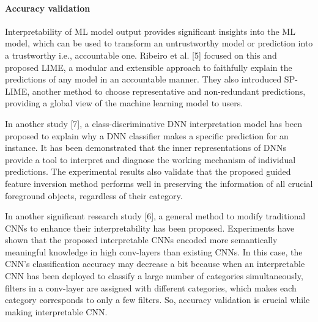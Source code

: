\paragraph{\textbf{Accuracy validation}}
Interpretability of ML model output provides significant insights into the ML model, which can be used to transform an untrustworthy model or prediction into a trustworthy i.e., accountable one. Ribeiro et al. [5] focused on this and proposed LIME, a modular and extensible approach to faithfully explain the predictions of any model in an accountable manner. They also introduced SP-LIME, another method to choose representative and non-redundant predictions, providing a global view of the machine learning model to users.

In another study [7], a class-discriminative DNN interpretation model has been proposed to explain why a DNN classifier makes a specific prediction for an instance. It has been demonstrated that the inner representations of DNNs provide a tool to interpret and diagnose the working mechanism of individual predictions. The experimental results also validate that the proposed guided feature inversion method performs well in preserving the information of all crucial foreground objects, regardless of their category.

In another significant research study [6], a general method to modify traditional CNNs to enhance their interpretability has been proposed. Experiments have shown that the proposed interpretable CNNs encoded more semantically meaningful knowledge in high conv-layers than existing CNNs. In this case, the CNN’s classification accuracy may decrease a bit because when an interpretable CNN has been deployed to classify a large number of categories simultaneously, filters in a conv-layer are assigned with different categories, which makes each category corresponds to only a few filters. So, accuracy validation is crucial while making interpretable CNN.
